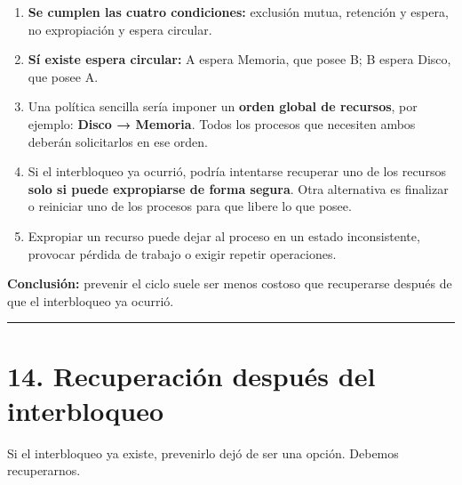 \documentclass[
  spanish,
  letterpaper,
]{scrbook}
\providecommand{\tightlist}{%
  \setlength{\itemsep}{0pt}\setlength{\parskip}{0pt}}
\begin{document}
\begin{tcolorbox}[enhanced jigsaw, arc=.35mm, bottomrule=.15mm, bottomtitle=1mm, breakable, colback=white, colbacktitle=quarto-callout-tip-color!10!white, colframe=quarto-callout-tip-color-frame, coltitle=black, left=2mm, leftrule=.75mm, opacityback=0, opacitybacktitle=0.6, rightrule=.15mm, title=\textcolor{quarto-callout-tip-color}{\faLightbulb}\hspace{0.5em}{✅ Ver solución}, titlerule=0mm, toprule=.15mm, toptitle=1mm]

\begin{enumerate}
\def\labelenumi{\arabic{enumi}.}
\tightlist
\item
  \textbf{Se cumplen las cuatro condiciones:} exclusión mutua, retención
  y espera, no expropiación y espera circular.
\item
  \textbf{Sí existe espera circular:} A espera Memoria, que posee B; B
  espera Disco, que posee A.
\item
  Una política sencilla sería imponer un \textbf{orden global de
  recursos}, por ejemplo: \textbf{Disco → Memoria}. Todos los procesos
  que necesiten ambos deberán solicitarlos en ese orden.
\item
  Si el interbloqueo ya ocurrió, podría intentarse recuperar uno de los
  recursos \textbf{solo si puede expropiarse de forma segura}. Otra
  alternativa es finalizar o reiniciar uno de los procesos para que
  libere lo que posee.
\item
  Expropiar un recurso puede dejar al proceso en un estado
  inconsistente, provocar pérdida de trabajo o exigir repetir
  operaciones.
\end{enumerate}

\textbf{Conclusión:} prevenir el ciclo suele ser menos costoso que
recuperarse después de que el interbloqueo ya ocurrió.

\end{tcolorbox}

\begin{center}\rule{0.5\linewidth}{0.5pt}\end{center}


\chapter{14. Recuperación después del
interbloqueo}\label{recuperaciuxf3n-despuuxe9s-del-interbloqueo}

Si el interbloqueo ya existe, prevenirlo dejó de ser una opción. Debemos
recuperarnos.
\end{document}
